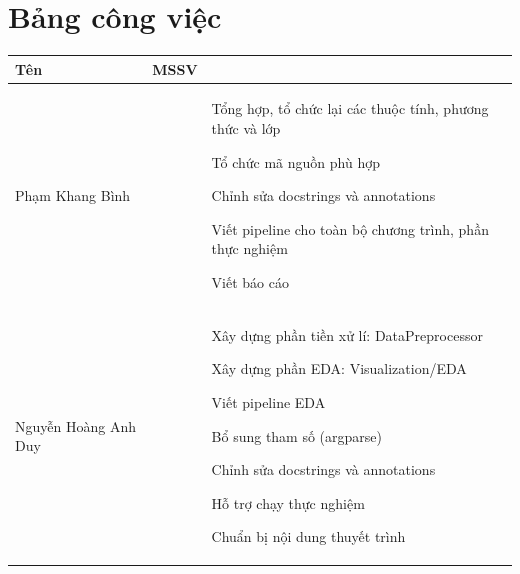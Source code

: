 \documentclass[12pt,a4paper]{article}
\begin{document}
\section{Bảng công việc}
\begin{table}[h!]
    \centering
    \renewcommand{\arraystretch}{1.4} 

    \begin{tabularx}{\textwidth}{|
        >{\centering\arraybackslash}m{4cm}|   
        >{\centering\arraybackslash}m{2.5cm}| 
        >{\raggedright\arraybackslash}X|      
    }
    \hline
    \textbf{Tên} & \textbf{MSSV} & \multicolumn{1}{c|}{\textbf{Công việc}} \\ \hline

    Phạm Khang Bình & 23280043 & 
    \begin{dashlist}
        \item Tổng hợp, tổ chức lại các thuộc tính, phương thức và lớp
        \item Tổ chức mã nguồn phù hợp
        \item Chỉnh sửa docstrings và annotations
        \item Viết pipeline cho toàn bộ chương trình, phần thực nghiệm
        \item Viết báo cáo
    \end{dashlist}
    \\ \hline
    
    Nguyễn Hoàng Anh Duy & 23280051 & 
    \begin{dashlist}
        \item Xây dựng phần tiền xử lí: DataPreprocessor
        \item Xây dựng phần EDA: Visualization/EDA
        \item Viết pipeline EDA
        \item Bổ sung tham số (argparse)
        \item Chỉnh sửa docstrings và annotations
        \item Hỗ trợ chạy thực nghiệm
        \item Chuẩn bị nội dung thuyết trình
    \end{dashlist}
    \\ \hline


\end{tabularx}
\end{table}
\end{document}
